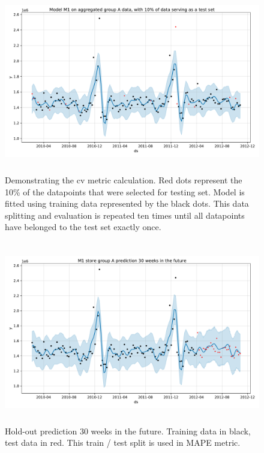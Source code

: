 \documentclass[english, 12pt, a4paper, sci, utf8, a-1b, online]{aaltothesis}
\begin{document}
\begin{abstractpage}[english]
\begin{figure}[htb]
	\centering
	\includegraphics[height=8cm]{../plots/forecasts/cv_metric_demo_plot.pdf}
	\caption{Demonstrating the cv metric calculation. Red dots represent the 10\% of the datapoints that were selected for testing set. Model is fitted using training data represented
	by the black dots. This data splitting and evaluation is repeated ten times until all datapoints have belonged to the test set exactly once.}
	\label{fig:cv_demo}
\end{figure}

\begin{figure}[htb]
	\centering
	\includegraphics[height=8cm]{../plots/forecasts/30_weeks_prediction_demo.pdf}
	\caption{Hold-out prediction 30 weeks in the future. Training data in black, test data in red. This train / test split is used in MAPE metric.}
	\label{fig:hold_out_data}
\end{figure}


\end{abstractpage}
\end{document}

